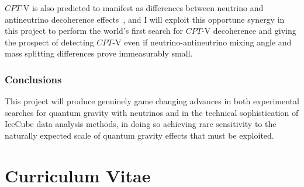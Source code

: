 \documentclass[a4paper,11pt]{article}
\begin{document}

$CPT$-V is also predicted to manifest as differences between neutrino and antineutrino decoherence effects~\cite{Mavromatos_2009, Barenboim:2004wu, Carrasco:2018sca, Buoninfante:2020iyr, Capolupo:2020myw}, and I will exploit this opportune synergy in this project to perform the world's first search for $CPT$-V decoherence and giving the prospect of detecting $CPT$-V even if neutrino-antineutrino mixing angle and mass splitting differences prove immeasurably small. \\

\subsubsection{Conclusions}


This project will produce genuinely game changing advances in both experimental searches for quantum gravity with neutrinos and in the technical sophistication of IceCube data analysis methods, in doing so achieving rare sensitivity to the naturally expected scale of quantum gravity effects that must be exploited. \\






\newpage

\section{Curriculum Vitae}
\end{document}

